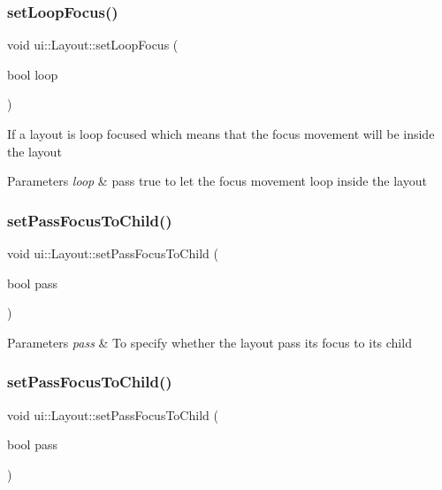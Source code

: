 \subsubsection{\texorpdfstring{set\+Loop\+Focus()}{setLoopFocus()}\hspace{0.1cm}{\footnotesize\ttfamily [2/2]}}
{\footnotesize\ttfamily void ui\+::\+Layout\+::set\+Loop\+Focus (\begin{DoxyParamCaption}\item[{bool}]{loop }\end{DoxyParamCaption})}

If a layout is loop focused which means that the focus movement will be inside the layout 
\begin{DoxyParams}{Parameters}
{\em loop} & pass true to let the focus movement loop inside the layout \\
\hline
\end{DoxyParams}
\mbox{\label{classui_1_1Layout_a5188ac4854ffba6818e19bfd0325828f}} 
\subsubsection{\texorpdfstring{set\+Pass\+Focus\+To\+Child()}{setPassFocusToChild()}\hspace{0.1cm}{\footnotesize\ttfamily [1/2]}}
{\footnotesize\ttfamily void ui\+::\+Layout\+::set\+Pass\+Focus\+To\+Child (\begin{DoxyParamCaption}\item[{bool}]{pass }\end{DoxyParamCaption})}


\begin{DoxyParams}{Parameters}
{\em pass} & To specify whether the layout pass its focus to its child \\
\hline
\end{DoxyParams}
\mbox{\label{classui_1_1Layout_a5188ac4854ffba6818e19bfd0325828f}} 
\subsubsection{\texorpdfstring{set\+Pass\+Focus\+To\+Child()}{setPassFocusToChild()}\hspace{0.1cm}{\footnotesize\ttfamily [2/2]}}
{\footnotesize\ttfamily void ui\+::\+Layout\+::set\+Pass\+Focus\+To\+Child (\begin{DoxyParamCaption}\item[{bool}]{pass }\end{DoxyParamCaption})}


